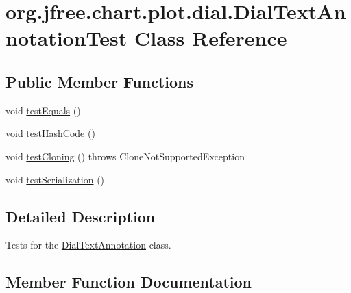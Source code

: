 \hypertarget{classorg_1_1jfree_1_1chart_1_1plot_1_1dial_1_1_dial_text_annotation_test}{}\section{org.\+jfree.\+chart.\+plot.\+dial.\+Dial\+Text\+Annotation\+Test Class Reference}
\label{classorg_1_1jfree_1_1chart_1_1plot_1_1dial_1_1_dial_text_annotation_test}
\subsection*{Public Member Functions}
\begin{DoxyCompactItemize}
\item 
void \mbox{\hyperlink{classorg_1_1jfree_1_1chart_1_1plot_1_1dial_1_1_dial_text_annotation_test_a551c082669ce860d28cab244b7f0d3d7}{test\+Equals}} ()
\item 
void \mbox{\hyperlink{classorg_1_1jfree_1_1chart_1_1plot_1_1dial_1_1_dial_text_annotation_test_ac8263364fb2f691e55efacf69e052636}{test\+Hash\+Code}} ()
\item 
void \mbox{\hyperlink{classorg_1_1jfree_1_1chart_1_1plot_1_1dial_1_1_dial_text_annotation_test_a6ec5dbb876ec9a9a5d46507a2a097ee5}{test\+Cloning}} ()  throws Clone\+Not\+Supported\+Exception 
\item 
void \mbox{\hyperlink{classorg_1_1jfree_1_1chart_1_1plot_1_1dial_1_1_dial_text_annotation_test_a1591e23af6ad32fff0292d2abf84c4af}{test\+Serialization}} ()
\end{DoxyCompactItemize}


\subsection{Detailed Description}
Tests for the \mbox{\hyperlink{classorg_1_1jfree_1_1chart_1_1plot_1_1dial_1_1_dial_text_annotation}{Dial\+Text\+Annotation}} class. 

\subsection{Member Function Documentation}
\mbox{\label{classorg_1_1jfree_1_1chart_1_1plot_1_1dial_1_1_dial_text_annotation_test_a6ec5dbb876ec9a9a5d46507a2a097ee5}} 
